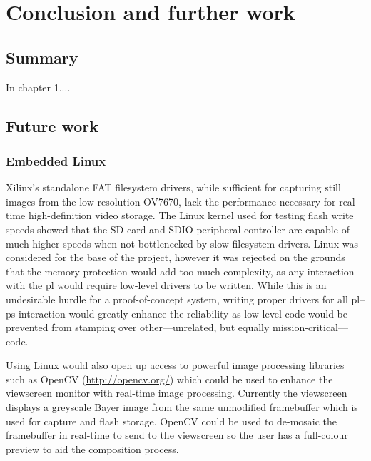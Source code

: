 \chapter{Conclusion and further work}






\section{Summary}

In chapter 1....

\section{Future work}

\subsection{Embedded Linux}

Xilinx's standalone FAT filesystem drivers, while sufficient for capturing still images from the low-resolution OV7670, lack the performance necessary for real-time high-definition video storage. The Linux kernel used for testing flash write speeds showed that the SD card and SDIO peripheral controller are capable of much higher speeds when not bottlenecked by slow filesystem drivers. Linux was considered for the base of the project, however it was rejected on the grounds that the memory protection would add too much complexity, as any interaction with the \gls{pl} would require low-level drivers to be written. While this is an undesirable hurdle for a proof-of-concept system, writing proper drivers for all \gls{pl}--\gls{ps} interaction would greatly enhance the reliability as low-level code would be prevented from stamping over other---unrelated, but equally mission-critical---code.

Using Linux would also open up access to powerful image processing libraries such as OpenCV (\url{http://opencv.org/}) which could be used to enhance the viewscreen monitor with real-time image processing. Currently the viewscreen displays a greyscale Bayer image from the same unmodified framebuffer which is used for capture and flash storage. OpenCV could be used to de-mosaic the framebuffer in real-time to send to the viewscreen so the user has a full-colour preview to aid the composition process.

